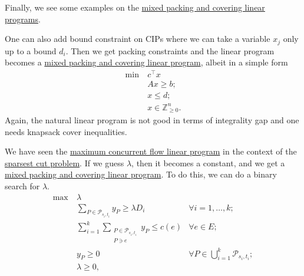 Finally, we see some examples on the \hyperref[def:mixed-packing-covering-LP]{mixed packing and covering linear programs}.

\begin{eg}
	One can also add bound constraint on CIPs where we can take a variable \(x_j\) only up to a bound \(d_i\). Then we get packing constraints and the linear program becomes a \hyperref[def:mixed-packing-covering-LP]{mixed packing and covering linear program}, albeit in a simple form
	\[
		\begin{aligned}
			\min~ & c^{\top} x                    \\
			      & Ax \geq b ;                   \\
			      & x \leq d ;                    \\
			      & x \in \mathbb{Z} _{\geq 0}^n.
		\end{aligned}
	\]
	Again, the natural linear program is not good in terms of integrality gap and one needs knapsack cover inequalities.
\end{eg}

\begin{eg}
	We have seen the \hyperref[eq:non-uniform-sparsest-cut-LP-dual]{maximum concurrent flow linear program} in the context of the \hyperref[prb:non-uniform-sparsest-cut]{sparsest cut problem}. If we guess \(\lambda \), then it becomes a constant, and we get a \hyperref[def:mixed-packing-covering-LP]{mixed packing and covering linear program}. To do this, we can do a binary search for \(\lambda \).
	\[
		\begin{aligned}
			\max~ & \lambda                                                                                                                 \\
			      & \sum_{P \in \mathcal{P} _{s_i, t_i}} y_P \geq \lambda D_i    & \forall i = 1, \dots , k;                                \\
			      & \sum_{i=1}^{k} \sum_{\substack{P \in \mathcal{P} _{s_i, t_i}                                                            \\ P \ni e}} y_P \leq c(e) & \forall e \in E;                                         \\
			      & y_P \geq 0                                                   & \forall P \in \bigcup_{i=1}^{k} \mathcal{P} _{s_i, t_i}; \\
			      & \lambda \geq 0,
		\end{aligned}
	\]
\end{eg}

